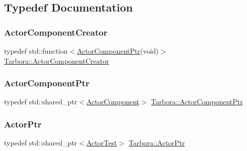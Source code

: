\subsection{Typedef Documentation}
\mbox{\label{namespaceTarbora_a82ab1ffad47e841a33a04227c0750f36}} 
\subsubsection{\texorpdfstring{Actor\+Component\+Creator}{ActorComponentCreator}}
{\footnotesize\ttfamily typedef std\+::function$<$\hyperlink{namespaceTarbora_a6cb50842d4c7a635fc744b4298b23e94}{Actor\+Component\+Ptr}(void)$>$ \hyperlink{namespaceTarbora_a82ab1ffad47e841a33a04227c0750f36}{Tarbora\+::\+Actor\+Component\+Creator}}

\mbox{\label{namespaceTarbora_a6cb50842d4c7a635fc744b4298b23e94}} 
\subsubsection{\texorpdfstring{Actor\+Component\+Ptr}{ActorComponentPtr}}
{\footnotesize\ttfamily typedef std\+::shared\+\_\+ptr$<$\hyperlink{classTarbora_1_1ActorComponent}{Actor\+Component}$>$ \hyperlink{namespaceTarbora_a6cb50842d4c7a635fc744b4298b23e94}{Tarbora\+::\+Actor\+Component\+Ptr}}

\mbox{\label{namespaceTarbora_a9931980f07865b0ab6094efe8a2edac1}} 
\subsubsection{\texorpdfstring{Actor\+Ptr}{ActorPtr}}
{\footnotesize\ttfamily typedef std\+::shared\+\_\+ptr$<$\hyperlink{classTarbora_1_1ActorTest}{Actor\+Test}$>$ \hyperlink{namespaceTarbora_a9931980f07865b0ab6094efe8a2edac1}{Tarbora\+::\+Actor\+Ptr}}

\mbox{\label{namespaceTarbora_ae4a9d4d5fbd397316e4c5cdba64ded4d}} 
